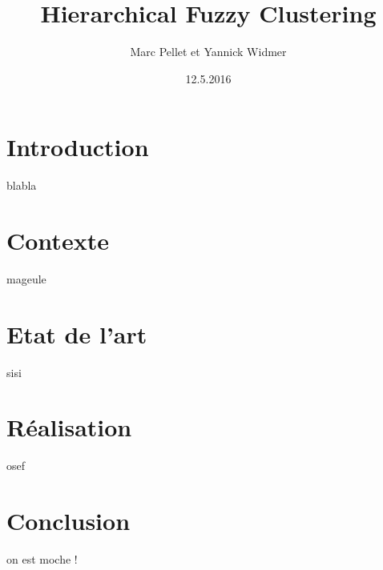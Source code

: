 \documentclass{article}
\title{Hierarchical Fuzzy Clustering}
\date{12.5.2016}
\author{Marc Pellet et Yannick Widmer}
\begin{document}
  \maketitle
  \tableofcontents
  \newpage
  
  \section{Introduction}
	blabla
  \section{Contexte}
	mageule	
  \section{Etat de l'art}
	sisi
  \section{Réalisation}
  osef
  
  \section{Conclusion}
	on est moche !
\end{document}
